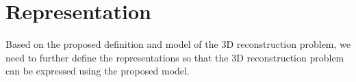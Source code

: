 

\section{Representation}
\label{sec:3DRecon_Rep}
Based on the proposed definition and model of the 3D reconstruction problem, we need to further define the representations so that the 3D reconstruction problem can be expressed using the proposed model.




